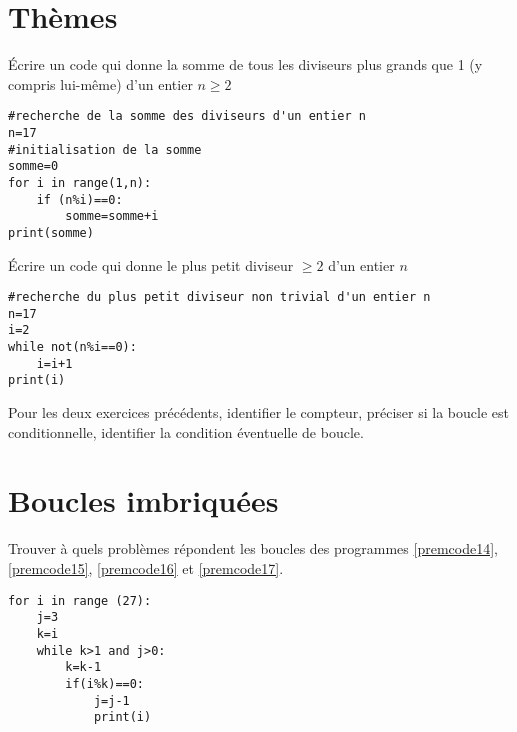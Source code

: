 \section{Thèmes}
\begin{Exercise}[counter={exo}]
\label{sommediv} 
Écrire un code qui donne la somme de tous les diviseurs plus grands que 1 (y compris lui-même) d'un entier $n\geq2$
\end{Exercise}

\begin{Answer}
\begin{lstlisting}[frame=lines, caption={somme des diviseurs},label=premcode12]
#recherche de la somme des diviseurs d'un entier n
n=17
#initialisation de la somme
somme=0
for i in range(1,n):
	if (n%i)==0:
		somme=somme+i
print(somme)
\end{lstlisting} 
\end{Answer}

\begin{Exercise}[counter={exo},label=ppd] Écrire un code qui donne le plus petit diviseur $\geq2$ d'un entier $n$
\end{Exercise}

\begin{Answer}[ref=ppd]
\begin{lstlisting}[frame=lines, caption={plus petit diviseur},label=premcode13]
#recherche du plus petit diviseur non trivial d'un entier n
n=17
i=2
while not(n%i==0):
	i=i+1
print(i)
\end{lstlisting} 
\end{Answer}

\begin{Exercise}[title={analyse},counter={exo}]
  Pour les deux exercices précédents, identifier le compteur, préciser si la boucle est conditionnelle, identifier la condition éventuelle de boucle.\\
 \end{Exercise}
 
\section{Boucles imbriquées}

Trouver à quels problèmes répondent les boucles des programmes \ref{premcode14}, \ref{premcode15}, \ref{premcode16} et \ref{premcode17}. 


\begin{lstlisting}[frame=lines, caption={ boucles imbriquées}, label=premcode14]
for i in range (27):
    j=3
	k=i
	while k>1 and j>0:
		k=k-1
		if(i%k)==0:
			j=j-1
			print(i)		
\end{lstlisting}

